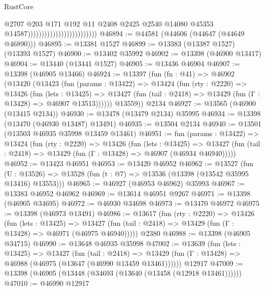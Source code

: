 \begin{lexlean}{RustCore}
\begin{coremodule}
                                                      @2707
                                                      @203
                                                      @171
                                                      @192
                                                      @11
                                                      @2408
                                                      @2425
                                                      @2540
                                                      @14080
                                                      @45353
                                                      @14587)))))))))))))))))))))))))
@46894 := @44581 (@44606 (@44647 (@44649 @46890)))
@46895 := @13381 @1527
@46899 := @13383 (@13387 @1527) (@13393 @1527)
@46900 := @13402 @35992
@46902 := @13398 (@46900 @13417)
@46904 := @13440 (@13441 @1527)
@46905 := @13436 @46904
@46907 := @13398 (@46905 @13466)
@46924 := @13397
    (fun (fn : @41) =>
    @46902
      (@13420
        (@13423
          (fun (params : @13422) =>
          @13424
            (fun (rty : @2220) =>
            @13426
              (fun (lets : @13425) =>
              @13427 (fun (tail : @2418) => @13429 (fun (Γ : @13428) => @46907 @13513))))))
        @13559))
    @2134
@46927 := @13565 (@46900 (@13415 @2134))
@46930 := @13478 (@13479 @2134) @35995
@46934 := @13398 (@13470 (@46930 @13487) @13491)
@46935 := @13504 @2134
@46940 := @13501 (@13503 @46935 @35998 @13459 @13461)
@46951 := fun (params : @13422) =>
  @13424
    (fun (rty : @2220) =>
    @13426
      (fun (lets : @13425) =>
      @13427 (fun (tail : @2418) => @13429 (fun (Γ : @13428) => @46907 (@46934 @46940)))))
@46952 := @13423 @46951
@46953 := @13420 @46952
@46962 := @13527
    (fun (U : @13526) => @13528 (fun (t : @7) => @13536 (@13398 (@13542 @35995 @13416) @13553)))
@46965 := @46927 (@46953 @46962) @35993
@46967 := @13383 @46952 @46962
@46969 := @13614 @46951 @9267
@46971 := @13398 (@46905 @34695)
@46972 := @46930 @34698
@46973 := @13470 @46972
@46975 := @13398 (@46973 @13491)
@46986 := @13617
    (fun (rty : @2220) =>
    @13426
      (fun (lets : @13425) =>
      @13427 (fun (tail : @2418) => @13429 (fun (Γ : @13428) => @46971 (@46975 @46940)))))
    @2380
@46988 := @13398 (@46905 @34715)
@46990 := @13648 @46935 @35998
@47002 := @13639
    (fun (lets : @13425) =>
    @13427
      (fun (tail : @2418) =>
      @13429 (fun (Γ : @13428) => @46988 (@46975 (@13647 (@46990 @13459 @13461))))))
    @12917
@47009 := @13398 (@46905 (@13448 (@34693 (@13640 (@13458 (@12918 @13461))))))
@47010 := @46990 @12917

\end{coremodule}
\end{lexlean}
